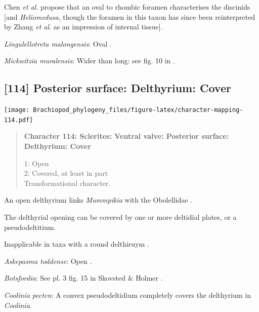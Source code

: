 \documentclass[openany]{book}
\begin{document}
Chen \emph{et al}. \citeyearpar{Chen2007Reinterpretationof} propose that
an oval to rhombic foramen characterises the discinids {[}and
\emph{Heliomedusa}, though the foramen in this taxon has since been
reinterpreted by Zhang \emph{et al}.
\citeyearpar{Zhang2009Architectureand} as an impression of internal
tissue{]}.

\hypertarget{Lingulellotreta_malongensis-coding-113}{}
\emph{Lingulellotreta malongensis}: Oval
\citep{Williams2000LinguliformeaCraniiformea}.

\hypertarget{Mickwitzia_muralensis-coding-113}{}
\emph{Mickwitzia muralensis}: Wider than long: see fig. 10 in
\citet{Balthasar2004Shellstructure}.

\subsection*{{[}114{]} Posterior surface: Delthyrium:
Cover}\label{posterior-surface-delthyrium-cover}

\texttt{[image: Brachiopod\_phylogeny\_files/figure-latex/character-mapping-114.pdf]}

\begin{quote}
\textbf{Character 114: Sclerites: Ventral valve: Posterior surface:
Delthyrium: Cover}

1: Open\\
2: Covered, at least in part\\
Transformational character.
\end{quote}

An open delthyrium links \emph{Mummpikia} with the Obolellidae
\citep{Balthasar2008iMummpikia}.

The delthyrial opening can be covered by one or more deltidial plates,
or a pseudodeltitium.

Inapplicable in taxa with a round delthiruym \citep[generated by
overgrowth of the delthyrial opening by posterolateral parts of the
shell, per][]{Popov1992TheCambrian}.

\hypertarget{Askepasma_toddense-coding-114}{}
\emph{Askepasma toddense}: Open \citep{Topper2013Theoldest}.

\hypertarget{Botsfordia-coding-114}{}
\emph{Botsfordia}: See pl. 3 fig. 15 in Skovsted \& Holmer
\citeyearpar{Skovsted2005EarlyCambrian}.

\hypertarget{Coolinia_pecten-coding-114}{}
\emph{Coolinia pecten}: A convex pseudodeltidium completely covers the
delthyrium in \emph{Coolinia}.
\end{document}
